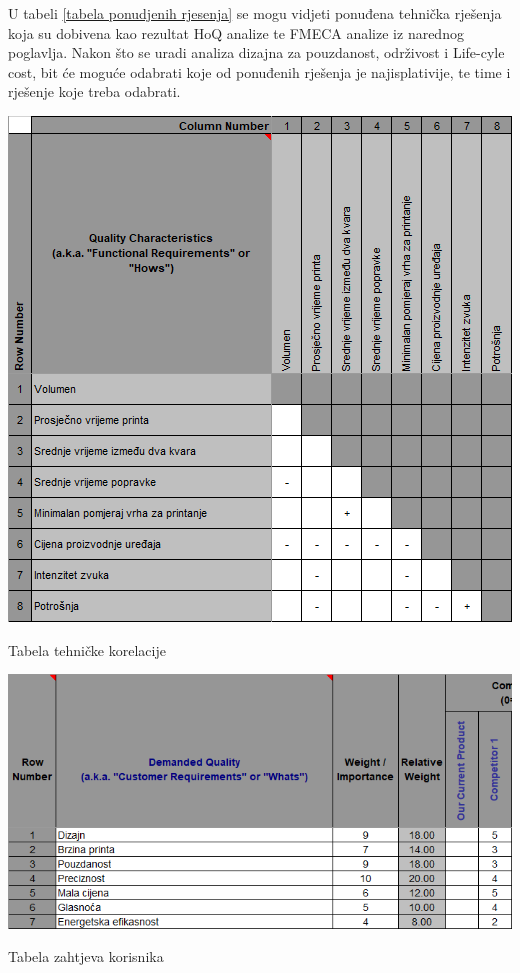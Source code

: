 \documentclass[12pt]{article}
\begin{document}
U tabeli \ref{tabela ponudjenih rjesenja} se mogu vidjeti ponuđena tehnička rješenja koja su dobivena kao rezultat HoQ analize te FMECA analize iz narednog poglavlja. Nakon što se uradi analiza dizajna za pouzdanost, održivost i Life-cyle cost, bit će moguće odabrati koje od ponuđenih rješenja je najisplativije, te time i rješenje koje treba odabrati. 
\begin{table}
\includegraphics[scale=1]{tabela_gornja}
\caption{Tabela tehničke korelacije}
\end{table}


\begin{table}
\includegraphics[width=\textwidth]{tabela_zahtjevi_korisnika}
\caption{Tabela zahtjeva korisnika}
\end{table}
\end{document}
